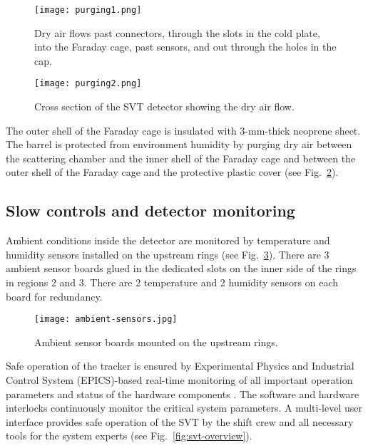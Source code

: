 \begin{figure}[hbt] 
\centering 
\texttt{[image: purging1.png]}
\caption{Dry air flows past connectors, through the slots in the cold plate, into the Faraday cage, past sensors, and out through the holes in the cap.}
\label{fig:purging1}
\end{figure}

\begin{figure}[hbt] 
\centering 
\texttt{[image: purging2.png]}
\caption{Cross section of the SVT detector showing the dry air flow.}
\label{fig:purging2}
\end{figure}

The outer shell of the Faraday cage is insulated with 3-mm-thick neoprene sheet. The barrel is protected from environment humidity by purging dry air between the scattering chamber and the inner shell of the Faraday cage and between the outer shell of the Faraday cage and the protective plastic cover (see Fig.~\ref{fig:purging2}). 

\subsection{Slow controls and detector monitoring}

Ambient conditions inside the detector are monitored by temperature and humidity sensors installed on the upstream rings (see Fig.~\ref{fig:ambient-sensors}). There are 3 ambient sensor boards glued in the dedicated slots on the inner side of the rings in regions 2 and 3. There are 2 temperature and 2 humidity sensors on each board for redundancy. 

\begin{figure}[hbt] 
\centering 
\texttt{[image: ambient-sensors.jpg]}
\caption{Ambient sensor boards mounted on the upstream rings.}
\label{fig:ambient-sensors}
\end{figure}

Safe operation of the tracker is ensured by Experimental Physics and Industrial Control System (EPICS)-based real-time monitoring of all important operation parameters and status of the hardware components \cite{EPICS}. The software and hardware interlocks continuously monitor the critical system parameters. A multi-level user interface provides safe operation of the SVT by the shift crew and all necessary tools for the system experts (see Fig.~\ref{fig:svt-overview}).

